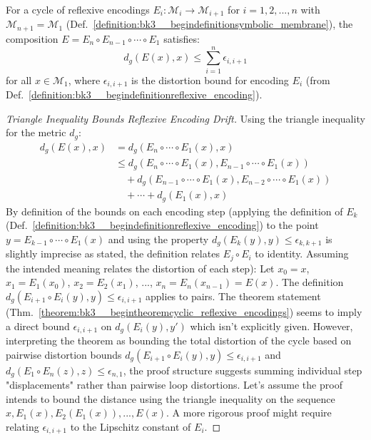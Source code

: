 \begin{theorem} \label{theorem:bk3__begintheoremcyclic_reflexive_encodings}
For a cycle of reflexive encodings $E_i: \mathcal{M}_i \rightarrow \mathcal{M}_{i+1}$ for $i = 1,2,...,n$ with $\mathcal{M}_{n+1} = \mathcal{M}_1$ (Def.~\ref{definition:bk3__begindefinitionsymbolic_membrane}), the composition $E = E_n \circ E_{n-1} \circ \cdots \circ E_1$ satisfies:
\[
d_g(E(x), x) \leq \sum_{i=1}^{n} \epsilon_{i,i+1}
\]
for all $x \in \mathcal{M}_1$, where $\epsilon_{i,i+1}$ is the distortion bound for encoding $E_i$ (from Def.~\ref{definition:bk3__begindefinitionreflexive_encoding}).
\end{theorem}

\begin{proof}[Triangle Inequality Bounds Reflexive Encoding Drift]
\label{proof:bk3_triangle_inequality_encoding_bound}
Using the triangle inequality for the metric $d_g$:
\begin{align*}
d_g(E(x), x) &= d_g(E_n \circ \cdots \circ E_1(x), x) \\
&\leq d_g(E_n \circ \cdots \circ E_1(x), E_{n-1} \circ \cdots \circ E_1(x)) \\
&\quad + d_g(E_{n-1} \circ \cdots \circ E_1(x), E_{n-2} \circ \cdots \circ E_1(x)) \\
&\quad + \cdots + d_g(E_1(x), x)
\end{align*}
By definition of the bounds on each encoding step (applying the definition of $E_k$ (Def.~\ref{definition:bk3__begindefinitionreflexive_encoding}) to the point $y = E_{k-1} \circ \cdots \circ E_1(x)$ and using the property $d_g(E_k(y), y) \leq \epsilon_{k, k+1}$ is slightly imprecise as stated, the definition relates $E_j \circ E_i$ to identity. Assuming the intended meaning relates the distortion of each step):
Let $x_0 = x$, $x_1 = E_1(x_0)$, $x_2 = E_2(x_1)$, ..., $x_n = E_n(x_{n-1}) = E(x)$.
The definition $d_g(E_{i+1} \circ E_i(y), y) \leq \epsilon_{i, i+1}$ applies to pairs. The theorem statement (Thm.~\ref{theorem:bk3__begintheoremcyclic_reflexive_encodings}) seems to imply a direct bound $\epsilon_{i,i+1}$ on $d_g(E_i(y), y')$ which isn't explicitly given. However, interpreting the theorem as bounding the total distortion of the cycle based on pairwise distortion bounds $d_g(E_{i+1} \circ E_i(y), y) \leq \epsilon_{i,i+1}$ and $d_g(E_1 \circ E_n(z), z) \leq \epsilon_{n,1}$, the proof structure suggests summing individual step "displacements" rather than pairwise loop distortions. Let's assume the proof intends to bound the distance using the triangle inequality on the sequence $x, E_1(x), E_2(E_1(x)), ..., E(x)$. A more rigorous proof might require relating $\epsilon_{i,i+1}$ to the Lipschitz constant of $E_i$.

\end{proof}
